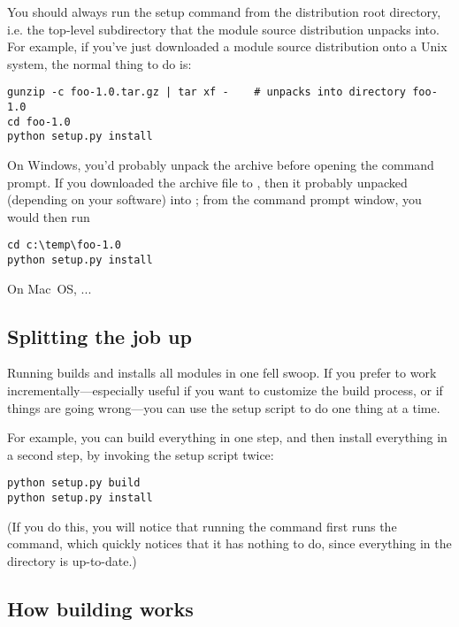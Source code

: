 \documentclass{howto}
\begin{document}
You should always run the setup command from the distribution root
directory, i.e. the top-level subdirectory that the module source
distribution unpacks into.  For example, if you've just downloaded a
module source distribution  onto a Unix system, the 
normal thing to do is:
\begin{verbatim}
gunzip -c foo-1.0.tar.gz | tar xf -    # unpacks into directory foo-1.0
cd foo-1.0
python setup.py install
\end{verbatim}

On Windows, you'd probably unpack the archive before opening the command
prompt.  If you downloaded the archive file to ,
then it probably unpacked (depending on your software) into
; from the command prompt window,
you would then run
\begin{verbatim}
cd c:\temp\foo-1.0
python setup.py install
\end{verbatim}

On Mac~OS, ... 



\subsection{Splitting the job up}

Running  builds and installs all modules in one
fell swoop.  If you prefer to work incrementally---especially useful if
you want to customize the build process, or if things are going
wrong---you can use the setup script to do one thing at a time.

For example, you can build everything in one step, and then install
everything in a second step, by invoking the setup script twice:
\begin{verbatim}
python setup.py build
python setup.py install
\end{verbatim}
(If you do this, you will notice that running the 
command first runs the  command, which quickly notices
that it has nothing to do, since everything in the 
directory is up-to-date.)



\subsection{How building works}
\end{document}
